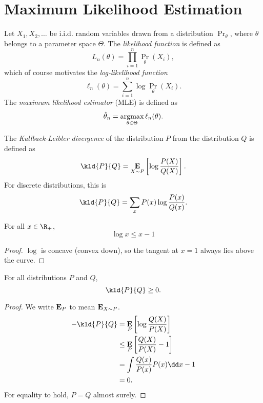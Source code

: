 \chapter{Maximum Likelihood Estimation} \label{chp:mle}

\begin{definition} \label{def:mle}
    Let $X_1, X_2, \dots$ be i.i.d. random variables drawn from a
    distribution $\Pr_{\theta}$, where $\theta$ belongs to a parameter space
    $\Theta$.
    The \emph{likelihood function} is defined as \[
        L_n(\theta) = \prod_{i=1}^{n} \Pr_{\theta}(X_i),
    \]
    which of course motivates the
    \emph{log-likelihood function} \[
        \ell_n(\theta) = \sum_{i=1}^{n} \log \Pr_{\theta}(X_i).
    \] The \emph{maximum likelihood estimator} (MLE) is defined as \[
        \hat{\theta}_n = \operatorname*{argmax}_{\theta \in \Theta} \ell_n(\theta).
    \]
\end{definition}

\begin{definition*}[KL divergence] \label{def:kl_div}
    The \emph{Kullback-Leibler divergence} of the distribution $P$ from the
    distribution $Q$ is defined as \[
        \kld{P}{Q} = \E_{X \sim P} \left[\log \frac{P(X)}{Q(X)} \right].
    \]
    For discrete distributions, this is \[
        \kld{P}{Q} = \sum_{x} P(x) \log \frac{P(x)}{Q(x)}.
    \]
\end{definition*}

\begin{lemma}
    For all $x \in \R_+$, \[
        \log x \le x - 1
    \]
\end{lemma}
\begin{proof}
    $\log$ is concave (convex down),
    so the tangent at $x = 1$ always lies above the curve.
\end{proof}
\begin{proposition*}
    For all distributions $P$ and $Q$, \[
        \kld{P}{Q} \ge 0.
    \]
\end{proposition*}
\begin{proof}
    We write $\operatorname*{\textbf{E}}_P$ to mean $\operatorname*{\textbf{E}}_{X \sim P}$.
    \begin{align*}
        -\kld{P}{Q} &= \E_P \left[\log \frac{Q(X)}{P(X)} \right] \\
        &\le \E_P \left[\frac{Q(X)}{P(X)} - 1 \right] \\
        &= \int \frac{Q(x)}{P(x)} P(x) \dd x - 1 \\
        &= 0.
    \end{align*}
    For equality to hold, $P = Q$ almost surely.
\end{proof}

